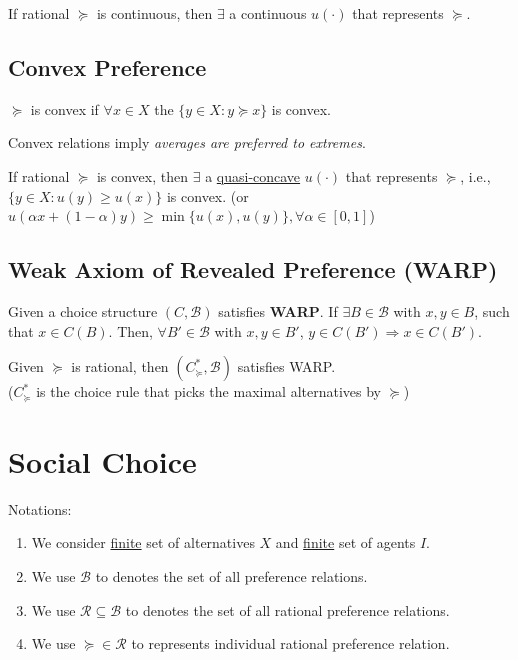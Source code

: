 \documentclass[11pt]{elegantbook}
\begin{document}
\begin{proposition}
    If rational $\succeq$ is continuous, then $\exists$ a continuous $u(\cdot)$ that represents $\succeq$.
\end{proposition}

\subsection{Convex Preference}
\begin{definition}
    \normalfont
    $\succeq$ is convex if $\forall x\in X$ the $\{y\in X: y\succeq x\}$ is convex.
\end{definition}
Convex relations imply \textit{averages are preferred to extremes}.
\begin{proposition}
    If rational $\succeq$ is convex, then $\exists$ a \underline{quasi-concave} $u(\cdot)$ that represents $\succeq$, i.e., $\{y\in X: u(y)\geq u(x)\}$ is convex. (or $u(\alpha x+(1-\alpha)y)\geq \min \{u(x),u(y)\}, \forall \alpha\in [0,1]$)
\end{proposition}

\subsection{Weak Axiom of Revealed Preference (WARP)}
\begin{definition}
    \normalfont
    Given a choice structure $(C,\mathcal{B})$ satisfies \textbf{WARP}. If $\exists B\in \mathcal{B}$ with $x,y\in B$, such that $x\in C(B)$. Then, $\forall B'\in \mathcal{B}$ with $x,y\in B'$, $y\in C(B') \Rightarrow x\in C(B')$.
\end{definition}

\begin{proposition}
    Given $\succeq$ is rational, then $(C^*_{\succeq},\mathcal{B})$ satisfies WARP.\\
    ($C^*_{\succeq}$ is the choice rule that picks the maximal alternatives by $\succeq$)
\end{proposition}


\section{Social Choice}
Notations:
\begin{enumerate}
    \item We consider \underline{finite} set of alternatives $X$ and \underline{finite} set of agents $I$.
    \item We use $\mathcal{B}$ to denotes the set of all preference relations.
    \item We use $\mathcal{R}\subseteq \mathcal{B}$ to denotes the set of all rational preference relations.
    \item We use $\succeq\in \mathcal{R}$ to represents individual rational preference relation.
\end{enumerate}
\end{document}
